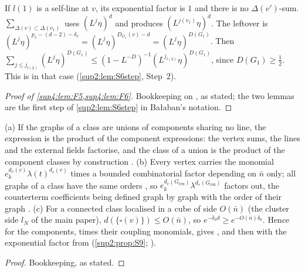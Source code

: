 \begin{lemma}[{F6: ``In the case $v=v'$ we make the same operations beginning with the summation over $\Delta(v)$'', \cite[p.~428]{Ba3}}]\label{sup4:lem:F6}
If $l(1)$ is a self-line at $v$, its exponential factor is $1$ and there is no $\Delta(v')$-sum. $\sum_{\Delta(v)\subset\Delta(v_1)}$ uses $(L^j\eta)^d$ and produces $(L^{j(v_1)}\eta)^d$. The leftover is $(L^j\eta)^{p_v-(d-2)-\delta_v}=(L^j\eta)^{D_{G_1}(v)-d}=(L^j\eta)^{D(G_1)}$. Then $\sum_{j\le j_{l(2)}}(L^j\eta)^{D(G_1)}\le(1-L^{-D})^{-1}(L^{j_{l(2)}}\eta)^{D(G_1)}$, since $D(G_1)\ge\frac12$. This is \cite[(2.15)]{Ba3} in that case (\cref{sup2:lem:S6step}, Step~2).
\end{lemma}

\begin{proof}[Proof of \cref{sup4:lem:F5,sup4:lem:F6}]
Bookkeeping on \cite[(2.14)]{Ba3}, as stated; the two lemmas are the first step of \cref{sup2:lem:S6step} in Ba{\l}aban's notation.
\end{proof}

\begin{lemma}\label{sup4:lem:F7}
\textup{(a)} If the graphs of a class are unions of components sharing no line, the expression is the product of the component expressions: the vertex sums, the lines and the external fields factorise, and the class of a union is the product of the component classes by construction \cite[pp.~431--432]{Ba3}. \textup{(b)} Every vertex carries the monomial $e_k^{d_v(v)}\lambda(t)^{d_s(v)}$ times a bounded combinatorial factor depending on $\bar n$ only; all graphs of a class have the same orders \cite[p.~420]{Ba3}, so $e_k^{d_v(G_{\mathrm{ren}})}\lambda^{d_s(G_{\mathrm{ren}})}$ factors out, the counterterm coefficients being defined graph by graph with the order of their graph \cite[p.~417]{Ba3}. \textup{(c)} For a connected class localised in a cube of side $O(\bar n)$ (the cluster side $l_N$ of the main paper), $d(\{\square(v)\})\le O(\bar n)$, so $e^{-\delta_0d}\ge e^{-O(\bar n)\delta_0}$. Hence \cite[(3.3)]{Ba3} for the components, times their coupling monomials, gives \cite[(3.2)]{Ba3}, and then \cite[(1.33)]{Ba3} with the exponential factor from \cite[(3.1)]{Ba3} (\cref{sup2:prop:S9}; \cite[p.~432]{Ba3}).
\end{lemma}

\begin{proof}
Bookkeeping, as stated.
\end{proof}
